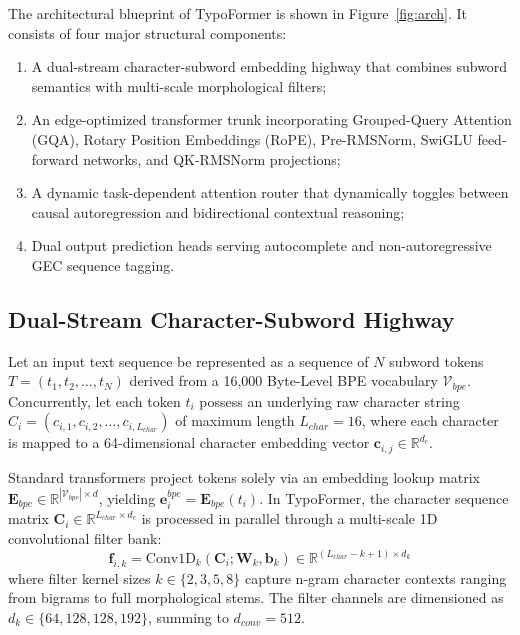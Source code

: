 \documentclass[10pt,journal,compsoc]{IEEEtran}
\begin{document}
The architectural blueprint of TypoFormer is shown in Figure~\ref{fig:arch}. It consists of four major structural components:
\begin{enumerate}
    \item A dual-stream character-subword embedding highway that combines subword semantics with multi-scale morphological filters;
    \item An edge-optimized transformer trunk incorporating Grouped-Query Attention (GQA), Rotary Position Embeddings (RoPE), Pre-RMSNorm, SwiGLU feed-forward networks, and QK-RMSNorm projections;
    \item A dynamic task-dependent attention router that dynamically toggles between causal autoregression and bidirectional contextual reasoning;
    \item Dual output prediction heads serving autocomplete and non-autoregressive GEC sequence tagging.
\end{enumerate}

\subsection{Dual-Stream Character-Subword Highway}
\label{sec:char_highway}
Let an input text sequence be represented as a sequence of $N$ subword tokens $T = (t_1, t_2, \dots, t_N)$ derived from a 16,000 Byte-Level BPE vocabulary $\mathcal{V}_{bpe}$. Concurrently, let each token $t_i$ possess an underlying raw character string $C_i = (c_{i,1}, c_{i,2}, \dots, c_{i,L_{char}})$ of maximum length $L_{char} = 16$, where each character is mapped to a 64-dimensional character embedding vector $\mathbf{c}_{i,j} \in \mathbb{R}^{d_c}$.

Standard transformers project tokens solely via an embedding lookup matrix $\mathbf{E}_{bpe} \in \mathbb{R}^{|\mathcal{V}_{bpe}| \times d}$, yielding $\mathbf{e}_i^{bpe} = \mathbf{E}_{bpe}(t_i)$. In TypoFormer, the character sequence matrix $\mathbf{C}_i \in \mathbb{R}^{L_{char} \times d_c}$ is processed in parallel through a multi-scale 1D convolutional filter bank:
\begin{equation}
\mathbf{f}_{i,k} = \mathrm{Conv1D}_k(\mathbf{C}_i; \mathbf{W}_k, \mathbf{b}_k) \in \mathbb{R}^{(L_{char} - k + 1) \times d_k}
\end{equation}
where filter kernel sizes $k \in \{2, 3, 5, 8\}$ capture n-gram character contexts ranging from bigrams to full morphological stems. The filter channels are dimensioned as $d_k \in \{64, 128, 128, 192\}$, summing to $d_{conv} = 512$.
\end{document}
